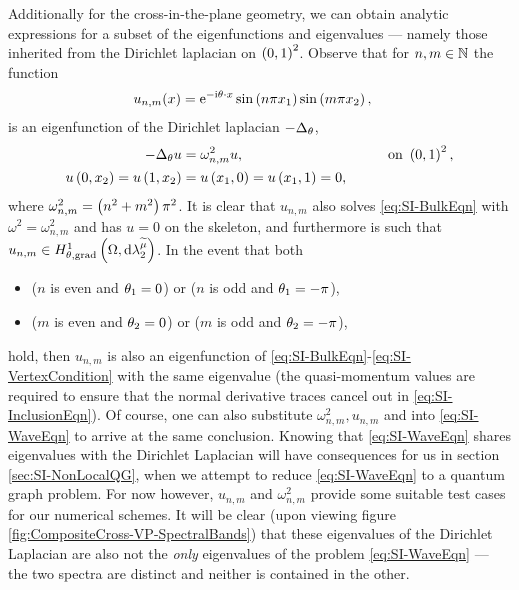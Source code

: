 Additionally for the cross-in-the-plane geometry, we can obtain analytic expressions for a subset of the eigenfunctions and eigenvalues --- namely those inherited from the Dirichlet laplacian on $\left( 0,1 \right)^2$.
Observe that for $n,m\in\mathbb{N}$ the function
\begin{align*}
	u_{n,m}(x) &= \mathrm{e}^{-\mathrm{i}\theta\cdot x}\sin\left( n\pi x_1 \right)\sin\left( m\pi x_2 \right),
\end{align*}
is an eigenfunction of the Dirichlet laplacian $-\Delta_{\theta}$,
\begin{align*}
	-\Delta_{\theta}u &= \omega_{n,m}^2 u, &\qquad \text{on } \left( 0,1 \right)^2, \\
	u\left( 0,x_2 \right) = u\left( 1,x_2 \right) &= u\left( x_1,0 \right) = u\left( x_1,1 \right) = 0,
\end{align*}
where $\omega_{n,m}^2 = \left( n^2+m^2 \right)\pi^2$.
It is clear that $u_{n,m}$ also solves \eqref{eq:SI-BulkEqn} with $\omega^2 = \omega_{n,m}^2$ and has $u=0$ on the skeleton, and furthermore is such that $u_{n,m}\in H^1_{\theta, \mathrm{grad}}\left( \Omega, \mathrm{d}\lambda_2^{\widetilde{\mu}} \right)$.
In the event that both
\begin{itemize}
	\item ($n$ is even and $\theta_1=0$) or ($n$ is odd and $\theta_1=-\pi$),
	\item ($m$ is even and $\theta_2=0$) or ($m$ is odd and $\theta_2=-\pi$),
\end{itemize}
hold, then $u_{n,m}$ is also an eigenfunction of \eqref{eq:SI-BulkEqn}-\eqref{eq:SI-VertexCondition} with the same eigenvalue (the quasi-momentum values are required to ensure that the normal derivative traces cancel out in \eqref{eq:SI-InclusionEqn}).
Of course, one can also substitute $\omega^2_{n,m}, u_{n,m}$ and into \eqref{eq:SI-WaveEqn} to arrive at the same conclusion.
Knowing that \eqref{eq:SI-WaveEqn} shares eigenvalues with the Dirichlet Laplacian will have consequences for us in section \ref{sec:SI-NonLocalQG}, when we attempt to reduce \eqref{eq:SI-WaveEqn} to a quantum graph problem.
For now however, $u_{n,m}$ and $\omega_{n,m}^2$ provide some suitable test cases for our numerical schemes.
It will be clear (upon viewing figure \ref{fig:CompositeCross-VP-SpectralBands}) that these eigenvalues of the Dirichlet Laplacian are also not the \emph{only} eigenvalues of the problem \eqref{eq:SI-WaveEqn} --- the two spectra are distinct and neither is contained in the other.